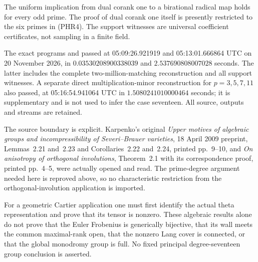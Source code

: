 \begin{remark}
\label{rem:prime-Heisenberg-rank-scope}
The uniform implication from dual corank one to a birational
radical map holds for every odd prime. The proof of dual corank
one itself is presently restricted to the six primes in (PHR4).
The support witnesses are universal coefficient certificates,
not sampling in a finite field.

The exact programs
and
passed at 05:09:26.921919 and 05:13:01.666864 UTC on
20 November 2026, in \(0.03530208900338039\) and
\(2.537690808007028\) seconds. The latter includes the complete
two-million-matching reconstruction and all support witnesses.
A separate direct multiplication-minor reconstruction for
\(p=3,5,7,11\) also passed, at 05:16:54.941064 UTC in
\(1.5080241010000464\) seconds; it is supplementary and is not
used to infer the case seventeen.
All source, outputs and streams are retained.

The source boundary is explicit. Karpenko's original
\emph{Upper motives of algebraic groups and incompressibility of
Severi--Brauer varieties}, 18 April 2009 preprint,
Lemmas~2.21 and~2.23 and Corollaries~2.22 and~2.24, printed pp.~9--10, and
\emph{On anisotropy of orthogonal involutions}, Theorem~2.1
with its correspondence proof, printed pp.~4--5, were actually
opened and read. The prime-degree argument needed here is
reproved above, so no characteristic restriction from the
orthogonal-involution application is imported.

For a geometric Cartier application one must first identify the
actual theta representation and prove that its tensor is nonzero.
These algebraic results alone do not prove that the Euler
Frobenius is generically bijective, that its wall meets the common
maximal-rank open, that the nonzero Lang cover is connected, or
that the global monodromy group is full. No fixed principal
degree-seventeen group conclusion is asserted.
\end{remark}
